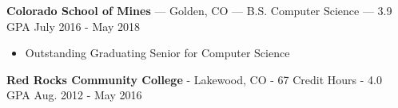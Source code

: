 \documentclass[10pt,letterpaper]{article}
\begin{document}
\textbf{Colorado School of Mines} --- Golden, CO --- B.S. Computer Science --- 3.9 GPA
\hfill July 2016 - May 2018
\begin{itemize}
    \item Outstanding Graduating Senior for Computer Science
\end{itemize}

\vspace{2pt}
\textbf{Red Rocks Community College} - Lakewood, CO - 67 Credit Hours - 4.0 GPA
\hfill Aug. 2012 - May 2016

\end{document}
